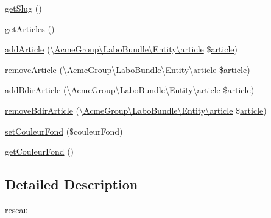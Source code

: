 \begin{DoxyCompactItemize}
\hyperlink{class_acme_group_1_1_labo_bundle_1_1_entity_1_1reseau_afd689e097ca075266a1e7c2e788966e6}{get\+Slug} ()
\item 
\hyperlink{class_acme_group_1_1_labo_bundle_1_1_entity_1_1reseau_a6448959d7971b4807288a3c3bf96b9f9}{get\+Articles} ()
\item 
\hyperlink{class_acme_group_1_1_labo_bundle_1_1_entity_1_1reseau_add14b4d91ed49bf623d978319ad41524}{add\+Article} (\textbackslash{}\hyperlink{class_acme_group_1_1_labo_bundle_1_1_entity_1_1article}{Acme\+Group\textbackslash{}\+Labo\+Bundle\textbackslash{}\+Entity\textbackslash{}article} \$\hyperlink{class_acme_group_1_1_labo_bundle_1_1_entity_1_1article}{article})
\item 
\hyperlink{class_acme_group_1_1_labo_bundle_1_1_entity_1_1reseau_aa1054a1394dd34e60b2d9b578bb72c42}{remove\+Article} (\textbackslash{}\hyperlink{class_acme_group_1_1_labo_bundle_1_1_entity_1_1article}{Acme\+Group\textbackslash{}\+Labo\+Bundle\textbackslash{}\+Entity\textbackslash{}article} \$\hyperlink{class_acme_group_1_1_labo_bundle_1_1_entity_1_1article}{article})
\item 
\hyperlink{class_acme_group_1_1_labo_bundle_1_1_entity_1_1reseau_aa92bf1994ec5a284a25d8b95bf46b54b}{add\+Bdir\+Article} (\textbackslash{}\hyperlink{class_acme_group_1_1_labo_bundle_1_1_entity_1_1article}{Acme\+Group\textbackslash{}\+Labo\+Bundle\textbackslash{}\+Entity\textbackslash{}article} \$\hyperlink{class_acme_group_1_1_labo_bundle_1_1_entity_1_1article}{article})
\item 
\hyperlink{class_acme_group_1_1_labo_bundle_1_1_entity_1_1reseau_abf3f3e8cb97066842c272e175c97057b}{remove\+Bdir\+Article} (\textbackslash{}\hyperlink{class_acme_group_1_1_labo_bundle_1_1_entity_1_1article}{Acme\+Group\textbackslash{}\+Labo\+Bundle\textbackslash{}\+Entity\textbackslash{}article} \$\hyperlink{class_acme_group_1_1_labo_bundle_1_1_entity_1_1article}{article})
\item 
\hyperlink{class_acme_group_1_1_labo_bundle_1_1_entity_1_1reseau_a8dabe1ced053fa55ca29ebec49554efd}{set\+Couleur\+Fond} (\$couleur\+Fond)
\item 
\hyperlink{class_acme_group_1_1_labo_bundle_1_1_entity_1_1reseau_a56bb89fc84bf7f2bcef80d2adbb28e73}{get\+Couleur\+Fond} ()
\end{DoxyCompactItemize}


\subsection{Detailed Description}
reseau

